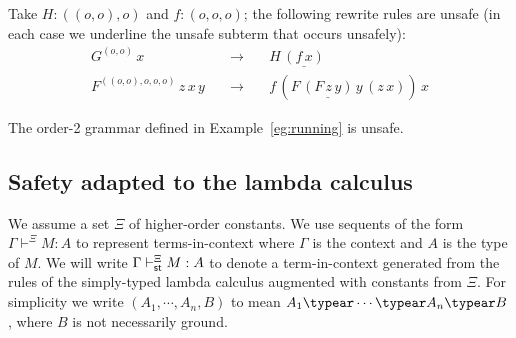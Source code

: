 \begin{example}\begin{inparaenum}[(i)] \item Take $H : ((o, o), o)$ and $f : (o, o, o)$; the
    following rewrite rules are unsafe (in each case we underline the
    unsafe subterm that occurs unsafely):
\[\begin{array}{rll}
G^{(o, o)} \, x & \quad \rightarrow \quad & H \, \underline{(f \, {x})} \\
F^{((o, o), o, o, o)} \, z \, x \, y & \quad \rightarrow \quad & f \, (F \, \underline{(F \, z
\, {y})} \, y \, (z \, x) ) \, x
\end{array}\]
\item The order-2 grammar defined in Example~\ref{eg:running} is
  unsafe.
\end{inparaenum}
\end{example}

\subsection*{Safety adapted to the lambda calculus}
We assume a set $\Xi$ of higher-order constants.
We use sequents of the form $\Gamma \vdash^\Xi M : A$ to represent
terms-in-context where $\Gamma$ is the context and $A$ is the type of
$M$. We will write $\Gamma \vdash_{\sf st}^\Xi M : A$ to denote a term-in-context generated from the rules of the simply-typed lambda calculus augmented with constants from $\Xi$.
For simplicity
we write $(A_1, \cdots, A_n, B)$ to mean $A_1 \typear \cdots \typear
A_n \typear B$, where $B$ is not necessarily ground.

